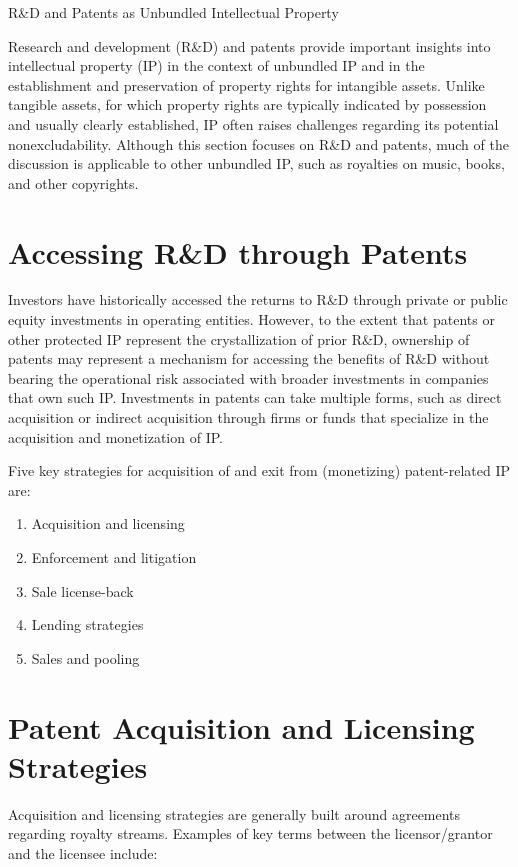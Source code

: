 \documentclass[11pt]{article}
\begin{document}
R\&D and Patents as Unbundled Intellectual Property

Research and development (R\&D) and patents provide important insights into intellectual property (IP) in the context of unbundled IP and in the establishment and preservation of property rights for intangible assets. Unlike tangible assets, for which property rights are typically indicated by possession and usually clearly established, IP often raises challenges regarding its potential nonexcludability. Although this section focuses on R\&D and patents, much of the discussion is applicable to other unbundled IP, such as royalties on music, books, and other copyrights.

\section*{Accessing R\&D through Patents}
Investors have historically accessed the returns to R\&D through private or public equity investments in operating entities. However, to the extent that patents or other protected IP represent the crystallization of prior R\&D, ownership of patents may represent a mechanism for accessing the benefits of R\&D without bearing the operational risk associated with broader investments in companies that own such IP. Investments in patents can take multiple forms, such as direct acquisition or indirect acquisition through firms or funds that specialize in the acquisition and monetization of IP.

Five key strategies for acquisition of and exit from (monetizing) patent-related IP are:

\begin{enumerate}
  \item Acquisition and licensing

  \item Enforcement and litigation

  \item Sale license-back

  \item Lending strategies

  \item Sales and pooling

\end{enumerate}

\section*{Patent Acquisition and Licensing Strategies}
Acquisition and licensing strategies are generally built around agreements regarding royalty streams. Examples of key terms between the licensor/grantor and the licensee include:
\end{document}
